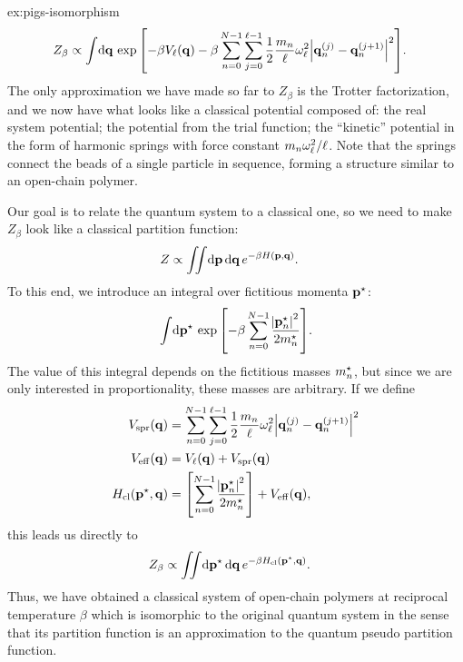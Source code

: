 \begin{DefAnswer}{ex:pigs-isomorphism}
	\begin{align}
		Z_\beta
		&\propto
			\int\! \dif \vec{q} \,
				\expb{
					-\beta V_\links(\vec{q})
					- \beta \sum_{n=0}^{N-1} \sum_{j=0}^{\links - 1}
						\frac{1}{2} \frac{m_n}{\links} \omega_\links^2 \abs{\vec{q}_n\bead{j} - \vec{q}_n\bead{j+1}}^2
				}.
	\end{align}
	The only approximation we have made so far to $Z_\beta$ is the Trotter factorization, and we now have what looks like a classical potential composed of: the real system potential; the potential from the trial function; the ``kinetic'' potential in the form of harmonic springs with force constant $m_n \omega_\ell^2 / \ell$.
	Note that the springs connect the beads of a single particle in sequence, forming a structure similar to an open-chain polymer.

	Our goal is to relate the quantum system to a classical one, so we need to make $Z_\beta$ look like a classical partition function:
	\begin{align}
		Z
		&\propto \iint\! \dif \vec{p} \dif \vec{q} \, e^{-\beta H(\vec{p}, \vec{q})}.
	\end{align}
	To this end, we introduce an integral over fictitious momenta ${\bm{\mathbf{p}}}^\star$:
	\begin{align}
		\int\! \dif \fict{\vec{p}} \, \expb{-\beta \sum_{n=0}^{N-1} \frac{\abs{\fict{\vec{p}}_n}^2}{2 \fict{m}_n}}.
	\end{align}
	The value of this integral depends on the fictitious masses ${m}^\star_n$, but since we are only interested in proportionality, these masses are arbitrary.
	If we define
	\begin{subequations} \label{eq:classical-equations}
	\begin{align}
		V_\mathrm{spr}(\bm{\mathbf{q}})
		&= \sum_{n=0}^{N-1} \sum_{j=0}^{\ell - 1}
			\frac{1}{2} \frac{m_n}{\ell} \omega_\ell^2
			\abs{\bm{\mathbf{q}}_n^{(j)} - \bm{\mathbf{q}}_n^{(j+1)}}^2
				\label{eq:classical-potential-spring} \\
		V_\mathrm{eff}(\bm{\mathbf{q}})
		&= V_\ell(\bm{\mathbf{q}}) + V_\mathrm{spr}(\bm{\mathbf{q}})
				\label{eq:classical-potential} \\
		H_\mathrm{cl}({\bm{\mathbf{p}}}^\star, \bm{\mathbf{q}})
		&= \left[ \sum_{n=0}^{N-1} \frac{\abs{{\bm{\mathbf{p}}}^\star_n}^2}{2 {m}^\star_n} \right] + V_\mathrm{eff}(\bm{\mathbf{q}}),
				\label{eq:classical-hamiltonian}
	\end{align}
	\end{subequations}
	this leads us directly to
	\begin{align}
		Z_\beta
		&\propto \iint\! \dif \fict{\vec{p}} \dif \vec{q} \, e^{-\beta \Hcl(\fict{\vec{p}}, \vec{q})}.
			\label{eq:classical-Z}
	\end{align}
	Thus, we have obtained a classical system of open-chain polymers at reciprocal temperature $\beta$ which is isomorphic to the original quantum system in the sense that its partition function is an approximation to the quantum pseudo partition function.


\end{DefAnswer}
